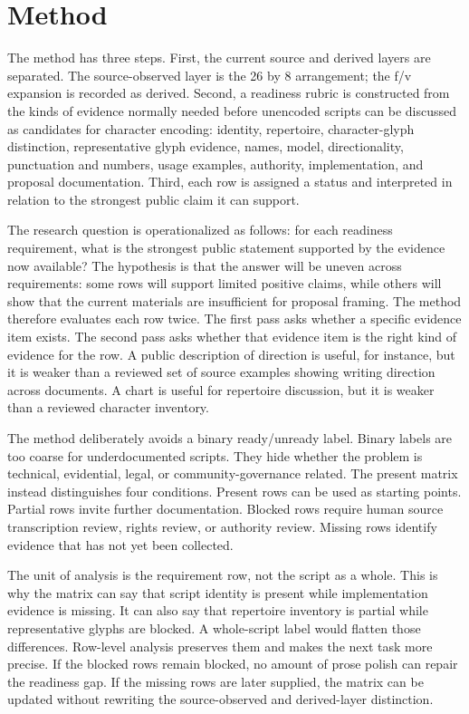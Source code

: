 \documentclass[sigconf,nonacm]{acmart}
\begin{document}
\section{Method}
The method has three steps. First, the current source and derived layers are
separated. The source-observed layer is the 26 by 8 arrangement; the f/v
expansion is recorded as derived. Second, a readiness rubric is constructed from
the kinds of evidence normally needed before unencoded scripts can be discussed
as candidates for character encoding: identity, repertoire, character-glyph
distinction, representative glyph evidence, names, model, directionality,
punctuation and numbers, usage examples, authority, implementation, and proposal
documentation. Third, each row is assigned a status and interpreted in relation
to the strongest public claim it can support.

The research question is operationalized as follows: for each readiness
requirement, what is the strongest public statement supported by the evidence
now available? The hypothesis is that the answer will be uneven across
requirements: some rows will support limited positive claims, while others will
show that the current materials are insufficient for proposal framing. The
method therefore evaluates each row twice. The first pass asks whether a
specific evidence item exists. The second pass asks whether that evidence item
is the right kind of evidence for the row. A public description of direction is
useful, for instance, but it is weaker than a reviewed set of source examples
showing writing direction across documents. A chart is useful for repertoire
discussion, but it is weaker than a reviewed character inventory.

The method deliberately avoids a binary ready/unready label. Binary labels are
too coarse for underdocumented scripts. They hide whether the problem is
technical, evidential, legal, or community-governance related. The present
matrix instead distinguishes four conditions. Present rows can be used as
starting points. Partial rows invite further documentation. Blocked rows require
human source transcription review, rights review, or authority review. Missing
rows identify evidence that has not yet been collected.

The unit of analysis is the requirement row, not the script as a whole. This is
why the matrix can say that script identity is present while implementation
evidence is missing. It can also say that repertoire inventory is partial while
representative glyphs are blocked. A whole-script label would flatten those
differences. Row-level analysis preserves them and makes the next task more
precise. If the blocked rows remain blocked, no amount of prose polish can
repair the readiness gap. If the missing rows are later supplied, the matrix can
be updated without rewriting the source-observed and derived-layer distinction.
\end{document}

